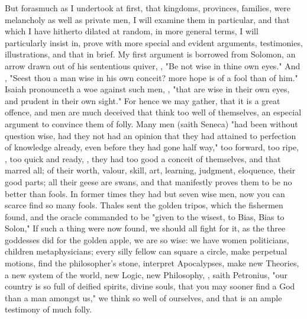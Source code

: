 But forasmuch as I undertook at first, that kingdoms, provinces, families, were
melancholy as well as private men, I will examine them in particular, and that
which I have hitherto dilated at random, in more general terms, I will
particularly insist in, prove with more special and evident arguments,
testimonies, illustrations, and that in brief.  My first argument is borrowed from
Solomon, an arrow drawn out of his sententious quiver, , "Be not wise in thine own eyes." And , "Seest thou a man
wise in his own conceit? more hope is of a fool than of him." Isaiah
pronounceth a woe against such men, , "that are wise
in their own eyes, and prudent in their own sight." For hence we may gather,
that it is a great offence, and men are much deceived that think too well of
themselves, an especial argument to convince them of folly. Many men (saith
Seneca) "had been without question wise, had they not had
an opinion that they had attained to perfection of knowledge already, even
before they had gone half way," too forward, too ripe, , too
quick and ready, , they had
too good a conceit of themselves, and that marred all; of their worth, valour,
skill, art, learning, judgment, eloquence, their good parts; all their geese
are swans, and that manifestly proves them to be no better than fools. In
former times they had but seven wise men, now you can scarce find so many
fools. Thales sent the golden tripos, which the fishermen found, and the oracle
commanded to be "given to the wisest, to Bias, Bias to
Solon," \etc{} If such a thing were now found, we should all fight for it, as
the three goddesses did for the golden apple, we are so wise: we have women
politicians, children metaphysicians; every silly fellow can square a circle,
make perpetual motions, find the philosopher's stone, interpret Apocalypses,
make new Theories, a new system of the world, new Logic, new Philosophy, \etc{}
, saith Petronius, "our country is
so full of deified spirits, divine souls, that you may sooner find a God than a
man amongst us," we think so well of ourselves, and that is an ample testimony
of much folly.

